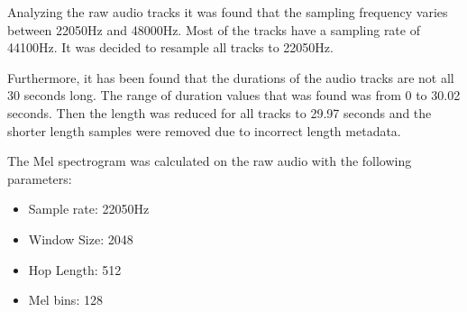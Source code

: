 Analyzing the raw audio tracks it was found that the sampling frequency varies between 22050Hz and 48000Hz. 
Most of the tracks have a sampling rate of 44100Hz.
It was decided to resample all tracks to 22050Hz.

Furthermore, it has been found that the durations of the audio tracks are not all 30 seconds long.
The range of duration values that was found was from 0 to 30.02 seconds.
Then the length was reduced for all tracks to 29.97 seconds and the shorter length samples were removed due to incorrect length metadata.


The Mel spectrogram was calculated on the raw audio with the following parameters: 
\begin{itemize}
  \item Sample rate: 22050Hz
  \item Window Size: 2048
  \item Hop Length: 512
  \item Mel bins: 128
\end{itemize}

